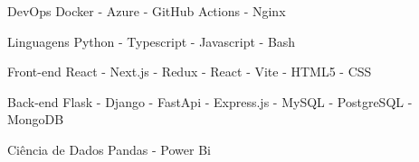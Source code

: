 

\begin{cvskills}

  \cvskill
    {DevOps} %
    {Docker - Azure - GitHub Actions - Nginx} %

  \cvskill
    {Linguagens} %
    {Python - Typescript - Javascript - Bash} %

  \cvskill
      {Front-end} %
      {React - Next.js - Redux - React - Vite - HTML5 - CSS} %

  \cvskill
    {Back-end} %
    {Flask - Django - FastApi - Express.js -  MySQL - PostgreSQL - MongoDB} %

  \cvskill
    {Ciência de Dados} %
    {Pandas - Power Bi} %

\end{cvskills}
